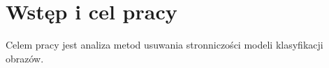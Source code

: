 \chapter{Wstęp i cel pracy}
\label{chap:wstep}

Celem pracy jest analiza metod usuwania stronniczości modeli klasyfikacji obrazów.